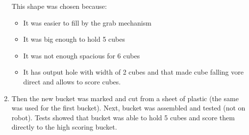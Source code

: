 \begin{enumerate}
  This shape was chosen because: 
  \begin{itemize}
  	\item It was easier to fill by the grab mechanism
  	\item It was big enough to hold 5 cubes
  	\item It was not enough spacious for 6 cubes
  	\item It has output hole with width of 2 cubes and that made cube falling vore direct and allows to score cubes.  
  \end{itemize}
  \item Then the new bucket was marked and cut from a sheet of plastic (the same was used for the first bucket). Next, bucket was assembled and tested (not on robot). Tests showed that bucket was able to hold 5 cubes and score them directly to the high scoring bucket. 
  

\end{enumerate}
